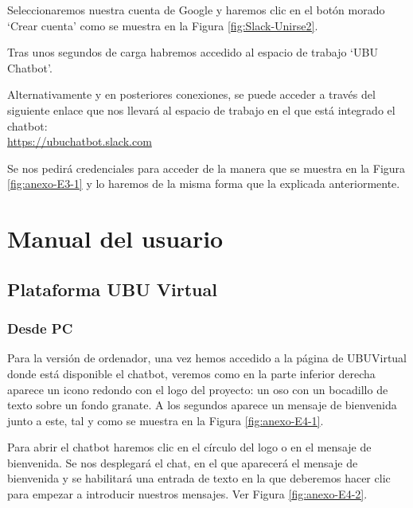 
Seleccionaremos nuestra cuenta de Google y haremos clic en el botón morado `Crear cuenta' como se muestra en la Figura \ref{fig:Slack-Unirse2}.


Tras unos segundos de carga habremos accedido al espacio de trabajo `UBU Chatbot'.

Alternativamente y en posteriores conexiones, se puede acceder a través del siguiente enlace que nos llevará al espacio de trabajo en el que está integrado el chatbot:\\
\url{https://ubuchatbot.slack.com}

Se nos pedirá credenciales para acceder de la manera que se muestra en la Figura \ref{fig:anexo-E3-1} y lo haremos de la misma forma que la explicada anteriormente.

\newpage

\section{Manual del usuario}

\subsection{Plataforma UBU Virtual}

\subsubsection{Desde PC} \label{subsection:marca-manualpc}

Para la versión de ordenador, una vez hemos accedido a la página de UBUVirtual donde está disponible el chatbot, veremos como en la parte inferior derecha aparece un icono redondo con el logo del proyecto: un oso con un bocadillo de texto sobre un fondo granate. A los segundos aparece un mensaje de bienvenida junto a este, tal y como se muestra en la Figura \ref{fig:anexo-E4-1}.


Para abrir el chatbot haremos clic en el círculo del logo o en el mensaje de bienvenida. Se nos desplegará el chat, en el que aparecerá el mensaje de bienvenida y se habilitará una entrada de texto en la que deberemos hacer clic para empezar a introducir nuestros mensajes. Ver Figura \ref{fig:anexo-E4-2}.

